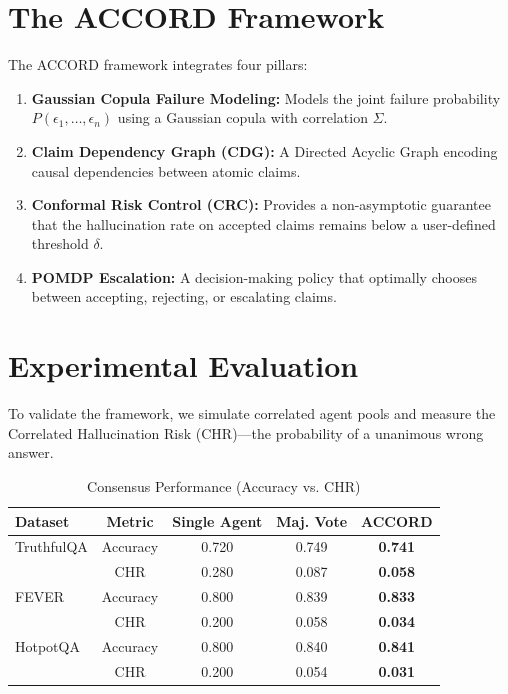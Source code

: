 \documentclass[conference]{IEEEtran}
\begin{document}
\section{The ACCORD Framework}
The ACCORD framework integrates four pillars:
\begin{enumerate}
    \item \textbf{Gaussian Copula Failure Modeling:} Models the joint failure probability $P(\epsilon_1, \dots, \epsilon_n)$ using a Gaussian copula with correlation $\Sigma$.
    \item \textbf{Claim Dependency Graph (CDG):} A Directed Acyclic Graph encoding causal dependencies between atomic claims.
    \item \textbf{Conformal Risk Control (CRC):} Provides a non-asymptotic guarantee that the hallucination rate on accepted claims remains below a user-defined threshold $\delta$.
    \item \textbf{POMDP Escalation:} A decision-making policy that optimally chooses between accepting, rejecting, or escalating claims.
\end{enumerate}

\section{Experimental Evaluation}
To validate the framework, we simulate correlated agent pools and measure the Correlated Hallucination Risk (CHR)---the probability of a unanimous wrong answer.

\begin{table}[htbp]
\caption{Consensus Performance (Accuracy vs. CHR)}
\label{tab:main_results}
\begin{center}
\begin{tabular}{lcccc}
\toprule
Dataset & Metric & Single Agent & Maj. Vote & \textbf{ACCORD} \\
\midrule
TruthfulQA & Accuracy & 0.720 & 0.749 & \textbf{0.741} \\
           & CHR      & 0.280 & 0.087 & \textbf{0.058} \\
\midrule
FEVER      & Accuracy & 0.800 & 0.839 & \textbf{0.833} \\
           & CHR      & 0.200 & 0.058 & \textbf{0.034} \\
\midrule
HotpotQA   & Accuracy & 0.800 & 0.840 & \textbf{0.841} \\
           & CHR      & 0.200 & 0.054 & \textbf{0.031} \\
\bottomrule
\end{tabular}
\end{center}
\end{table}
\end{document}
